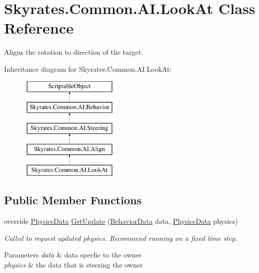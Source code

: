 \hypertarget{class_skyrates_1_1_common_1_1_a_i_1_1_look_at}{\section{Skyrates.\-Common.\-A\-I.\-Look\-At Class Reference}
\label{class_skyrates_1_1_common_1_1_a_i_1_1_look_at}
}


Aligns the rotation to direction of the target.  


Inheritance diagram for Skyrates.\-Common.\-A\-I.\-Look\-At\-:\begin{figure}[H]
\begin{center}
\leavevmode
\includegraphics[height=5.000000cm]{class_skyrates_1_1_common_1_1_a_i_1_1_look_at}
\end{center}
\end{figure}
\subsection*{Public Member Functions}
\begin{DoxyCompactItemize}
\item 
\hypertarget{class_skyrates_1_1_common_1_1_a_i_1_1_look_at_a0b7ed77c8ade69aa0fd0d55a142c1e9d}{override \hyperlink{class_skyrates_1_1_common_1_1_a_i_1_1_physics_data}{Physics\-Data} \hyperlink{class_skyrates_1_1_common_1_1_a_i_1_1_look_at_a0b7ed77c8ade69aa0fd0d55a142c1e9d}{Get\-Update} (\hyperlink{class_skyrates_1_1_common_1_1_a_i_1_1_behavior_data}{Behavior\-Data} data, \hyperlink{class_skyrates_1_1_common_1_1_a_i_1_1_physics_data}{Physics\-Data} physics)}\label{class_skyrates_1_1_common_1_1_a_i_1_1_look_at_a0b7ed77c8ade69aa0fd0d55a142c1e9d}

\begin{DoxyCompactList}\small\item\em Called to request updated physics. Recommend running on a fixed time step. 


\begin{DoxyParams}{Parameters}
{\em data} & data specfic to the owner\\
\hline
{\em physics} & the data that is steering the owner\\
\hline
\end{DoxyParams}
 \end{DoxyCompactList}\end{DoxyCompactItemize}
